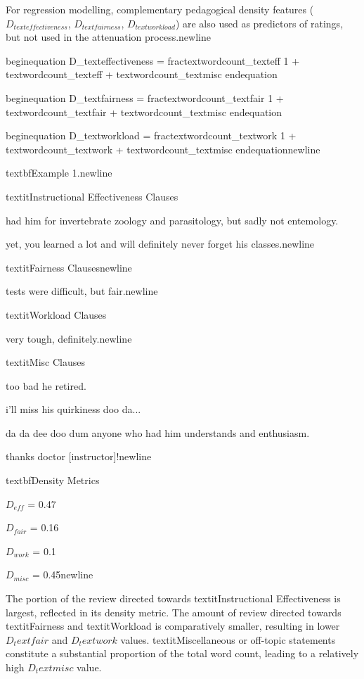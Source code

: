 For regression modelling, complementary pedagogical density features ($D_{text{effectiveness}}$, $D_{text{fairness}}$, $D_{text{workload}}$) are also used as predictors of ratings, but not used in the attenuation process.newline


begin{equation}
D_{text{effectiveness}} =
frac{text{wordcount}_{text{eff}}}
{1 + text{wordcount}_{text{eff}} + text{wordcount}_{text{misc}}}
end{equation}

begin{equation}
D_{text{fairness}} =
frac{text{wordcount}_{text{fair}}}
{1 + text{wordcount}_{text{fair}} + text{wordcount}_{text{misc}}}
end{equation}

begin{equation}
D_{text{workload}} =
frac{text{wordcount}_{text{work}}}
{1 + text{wordcount}_{text{work}} + text{wordcount}_{text{misc}}}
end{equation}newline

textbf{Example 1.}newline

textit{Instructional Effectiveness Clauses}

had him for invertebrate zoology and parasitology, but sadly not entemology.

yet, you learned a lot and will definitely never forget his classes.newline

textit{Fairness Clauses}newline

tests were difficult, but fair.newline

textit{Workload Clauses}

very tough, definitely.newline

textit{Misc Clauses}

too bad he retired.

i'll miss his quirkiness doo da...

da da dee doo dum anyone who had him understands and enthusiasm.

thanks doctor [instructor]!newline

textbf{Density Metrics}

$D_{eff}$ = 0.47

$D_{fair}$ = 0.16

$D_{work}$ = 0.1

$D_{misc}$ = 0.45newline

The portion of the review directed towards textit{Instructional Effectiveness} is largest, reflected in its density metric. The amount of review directed towards textit{Fairness} and textit{Workload} is comparatively smaller, resulting in lower $D_text{fair}$ and $D_text{work}$ values. textit{Miscellaneous} or off-topic statements constitute a substantial proportion of the total word count, leading to a relatively high $D_text{misc}$ value.

